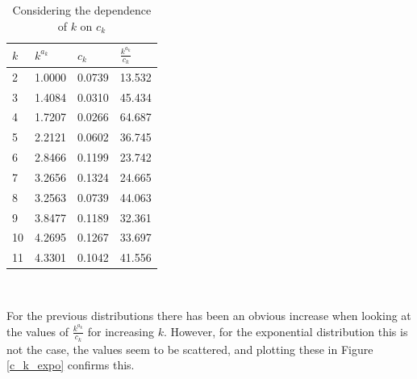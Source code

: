\documentclass[12pt]{report}
\begin{document}
\begin{table}
\caption{Considering the dependence of $k$ on $c_{k}$} \label{expo_dependentk}
\begin{center}
\begin{tabular}{| l | l l l |} 
\toprule
$k$ &  $k^{a_{k}}$ & $c_{k}$ & $\frac{k^{a_{k}}}{c_{k}}$ \\
\midrule[1pt]
2     & 1.0000    & 0.0739    &    13.532   \\
3     & 1.4084    & 0.0310    &    45.434   \\
4     & 1.7207    & 0.0266    &    64.687   \\
5     & 2.2121    & 0.0602    &    36.745   \\
6     & 2.8466    & 0.1199    &    23.742   \\
7     & 3.2656    & 0.1324    &    24.665   \\
8     & 3.2563    & 0.0739    &    44.063   \\
9     & 3.8477    & 0.1189    &    32.361   \\
10    & 4.2695    & 0.1267    &    33.697   \\
11    & 4.3301    & 0.1042    &    41.556   \\
\hline
\end{tabular}
\\[10pt]
\end{center}
\end{table}

For the previous distributions there has been an obvious increase when looking at the values of $\frac{k^{a_{k}}}{c_{k}}$ for increasing $k$. However, for the exponential distribution this is not the case, the values seem to be scattered, and plotting these in Figure \ref{c_k_expo} confirms this. 
\end{document}
